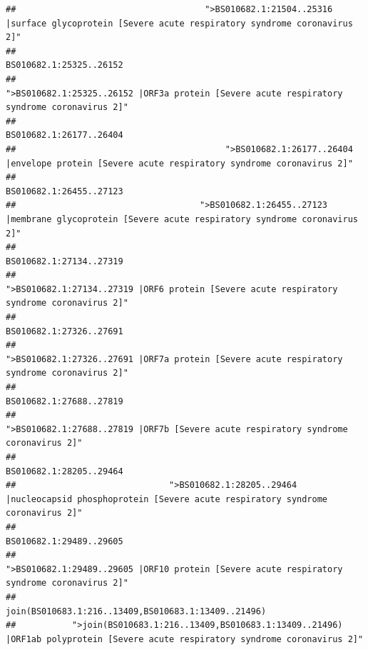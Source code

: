 \documentclass[
]{article}
\begin{document}
\begin{verbatim}
##                                     ">BS010682.1:21504..25316 |surface glycoprotein [Severe acute respiratory syndrome coronavirus 2]" 
##                                                                                                                BS010682.1:25325..26152 
##                                            ">BS010682.1:25325..26152 |ORF3a protein [Severe acute respiratory syndrome coronavirus 2]" 
##                                                                                                                BS010682.1:26177..26404 
##                                         ">BS010682.1:26177..26404 |envelope protein [Severe acute respiratory syndrome coronavirus 2]" 
##                                                                                                                BS010682.1:26455..27123 
##                                    ">BS010682.1:26455..27123 |membrane glycoprotein [Severe acute respiratory syndrome coronavirus 2]" 
##                                                                                                                BS010682.1:27134..27319 
##                                             ">BS010682.1:27134..27319 |ORF6 protein [Severe acute respiratory syndrome coronavirus 2]" 
##                                                                                                                BS010682.1:27326..27691 
##                                            ">BS010682.1:27326..27691 |ORF7a protein [Severe acute respiratory syndrome coronavirus 2]" 
##                                                                                                                BS010682.1:27688..27819 
##                                                    ">BS010682.1:27688..27819 |ORF7b [Severe acute respiratory syndrome coronavirus 2]" 
##                                                                                                                BS010682.1:28205..29464 
##                              ">BS010682.1:28205..29464 |nucleocapsid phosphoprotein [Severe acute respiratory syndrome coronavirus 2]" 
##                                                                                                                BS010682.1:29489..29605 
##                                            ">BS010682.1:29489..29605 |ORF10 protein [Severe acute respiratory syndrome coronavirus 2]" 
##                                                                                    join(BS010683.1:216..13409,BS010683.1:13409..21496) 
##           ">join(BS010683.1:216..13409,BS010683.1:13409..21496) |ORF1ab polyprotein [Severe acute respiratory syndrome coronavirus 2]" 

\end{verbatim}
\end{document}
